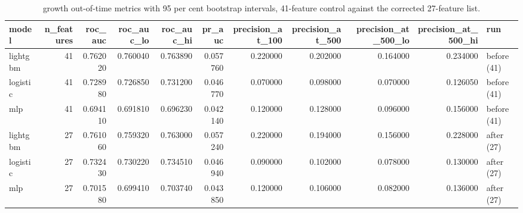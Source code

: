 \begin{table}
\caption{growth out-of-time metrics with 95 per cent bootstrap intervals, 41-feature control against the corrected 27-feature list.}
\label{tab:growth_before_after_metrics}
\begin{tabular}{lrrrrrrrrrl}
\toprule
model & n_features & roc_auc & roc_auc_lo & roc_auc_hi & pr_auc & precision_at_100 & precision_at_500 & precision_at_500_lo & precision_at_500_hi & run \\
\midrule
lightgbm & 41 & 0.762020 & 0.760040 & 0.763890 & 0.057760 & 0.220000 & 0.202000 & 0.164000 & 0.234000 & before (41) \\
logistic & 41 & 0.728980 & 0.726850 & 0.731200 & 0.046770 & 0.070000 & 0.098000 & 0.070000 & 0.126050 & before (41) \\
mlp & 41 & 0.694110 & 0.691810 & 0.696230 & 0.042140 & 0.120000 & 0.128000 & 0.096000 & 0.156000 & before (41) \\
lightgbm & 27 & 0.761060 & 0.759320 & 0.763000 & 0.057240 & 0.220000 & 0.194000 & 0.156000 & 0.228000 & after (27) \\
logistic & 27 & 0.732430 & 0.730220 & 0.734510 & 0.046940 & 0.090000 & 0.102000 & 0.078000 & 0.130000 & after (27) \\
mlp & 27 & 0.701580 & 0.699410 & 0.703740 & 0.043850 & 0.120000 & 0.106000 & 0.082000 & 0.136000 & after (27) \\
\bottomrule
\end{tabular}
\end{table}
